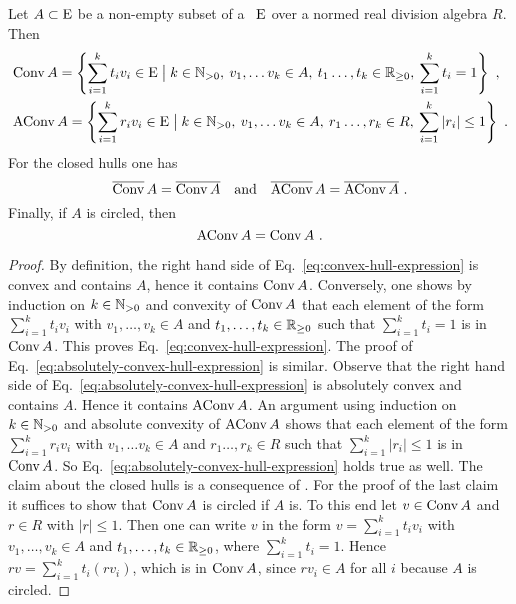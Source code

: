 \begin{lemma}\label{thm:representation-convex-absolutely-convex-hulls-closures}
  Let $A \subset \mathrm{E}$ be a non-empty subset of a \tvs~$\mathrm{E}$
  over a normed real division algebra $R$. Then
  \begin{align}
    \label{eq:convex-hull-expression}
    & \operatorname{Conv} A  = \left\{ \sum_{i=1}^k t_i v_i\in
    \mathrm{E} \bigm\vert k \in \mathbb{N}_{> 0},\: v_1,\ldots v_k\in A,\: t_1\ldots ,t_k \in \mathbb{R}_{\geq 0}, \: \sum_{i=1}^k t_i = 1 \right\} 
      \ , \\
    \label{eq:absolutely-convex-hull-expression}
    & \operatorname{AConv} A  = \left\{ \sum_{i=1}^k r_i v_i\in
    \mathrm{E} \bigm\vert k \in \mathbb{N}_{> 0},\: v_1,\ldots v_k\in A,\: r_1\ldots ,r_k \in R, \: \sum_{i=1}^k |r_i| \leq 1 \right\}
    \ .   
  \end{align}
  For the closed hulls one has  
  \[
    \clconvHull A = \overline{\convHull A} \quad \text{and} \quad \clabsconvHull A = \overline{\absconvHull A} \ .
  \]
  Finally, if $A$ is circled, then
  \[
     \operatorname{AConv} A = \operatorname{Conv} A  \ .
  \]
\end{lemma}

\begin{proof}
  By definition, the right hand side of Eq.~\eqref{eq:convex-hull-expression} is convex and contains $A$,
  hence it contains $\operatorname{Conv} A$. Conversely, one shows by induction on $k\in \mathbb{N}_{> 0}$ and convexity of $\operatorname{Conv} A$
  that each element of the form $\sum_{i=1}^k t_i v_i$ with $v_1,\ldots , v_k\in A$ and
  $t_1,\ldots ,t_k \in \mathbb{R}_{\geq 0}$  such that $\sum_{i=1}^k t_i = 1$ is in  $\operatorname{Conv} A$. This proves
  Eq.~\eqref{eq:convex-hull-expression}.
  The proof of Eq.~\eqref{eq:absolutely-convex-hull-expression} is similar. Observe that the right hand side of
  Eq.~\eqref{eq:absolutely-convex-hull-expression} is absolutely convex and contains $A$.
  Hence it contains $\operatorname{AConv} A$. An argument using induction on $k\in \mathbb{N}_{> 0}$ and absolute convexity of
  $\operatorname{AConv} A$ shows that each element of the form $\sum_{i=1}^k r_i v_i$ with $v_1,\ldots v_k\in A$ and
  $r_1\ldots ,r_k \in R$  such that $\sum_{i=1}^k |r_i| \leq 1$ is in  $\operatorname{Conv} A$.
  So Eq.~\eqref{eq:absolutely-convex-hull-expression} holds true as well. 
  The claim about the closed hulls is a consequence of .
  For the proof of the last claim it suffices to show that $\operatorname{Conv} A$ is circled if $A$ is.
  To this end let $v \in \operatorname{Conv} A$  and $r\in R$ with $|r|\leq 1$. Then
  one can write $v$ in the form $v = \sum_{i=1}^k t_i v_i$ with
  $v_1,\ldots, v_k\in A$ and $t_1, \ldots ,t_k \in \mathbb{R}_{\geq 0}$, where $\sum_{i=1}^k t_i = 1$.
  Hence $rv =  \sum_{i=1}^k t_i (rv_i)$, which is in $\operatorname{Conv} A$, since $rv_i\in A$ for all $i$ because
  $A$ is circled. 
\end{proof}

